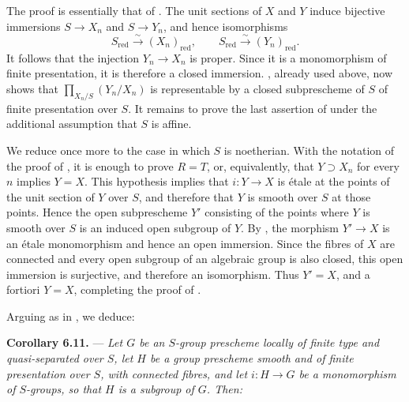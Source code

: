 The proof is essentially that of
.  The unit sections of \(X\)
and \(Y\) induce bijective immersions \(S\to X_n\) and
\(S\to Y_n\), and hence isomorphisms
\[
  S_{\mathrm{red}}\xrightarrow{\sim}(X_n)_{\mathrm{red}},
  \qquad
  S_{\mathrm{red}}\xrightarrow{\sim}(Y_n)_{\mathrm{red}}.
\]
It follows that the injection \(Y_n\to X_n\) is proper.  Since it is
a monomorphism of finite presentation, it is therefore a closed
immersion.  , already used above, now shows that
\(\prod_{X_n/S}(Y_n/X_n)\) is representable by a closed
subprescheme of \(S\) of finite presentation over \(S\).  It remains
to prove the last assertion of
 under the additional
assumption that \(S\) is affine.

We reduce once more to the case in which \(S\) is noetherian.  With
the notation of the proof of
, it is enough to prove
\(R=T\), or, equivalently, that \(Y\supset X_n\) for every \(n\)
implies \(Y=X\).  This hypothesis implies that \(i:Y\to X\) is
étale at the points of the unit section of \(Y\) over \(S\), and
therefore that \(Y\) is smooth over \(S\) at those points.  Hence the
open subprescheme \(Y'\) consisting of the points where \(Y\) is
smooth over \(S\) is an induced open subgroup of \(Y\).  By , the morphism \(Y'\to X\) is an étale monomorphism and hence
an open immersion.  Since the fibres of \(X\) are connected and
every open subgroup of an algebraic group is also closed, this open
immersion is surjective, and therefore an isomorphism.  Thus
\(Y'=X\), and a fortiori \(Y=X\), completing the proof of
.

Arguing as in , we deduce:

\medskip
\noindent{}\textbf{Corollary 6.11.}
---
\textit{Let \(G\) be an \(S\)-group prescheme locally of finite type
and quasi-separated over \(S\), let \(H\) be a group prescheme
smooth and of finite presentation over \(S\), with connected
fibres, and let \(i:H\to G\) be a monomorphism of \(S\)-groups, so
that \(H\) is a subgroup of \(G\).  Then:}

